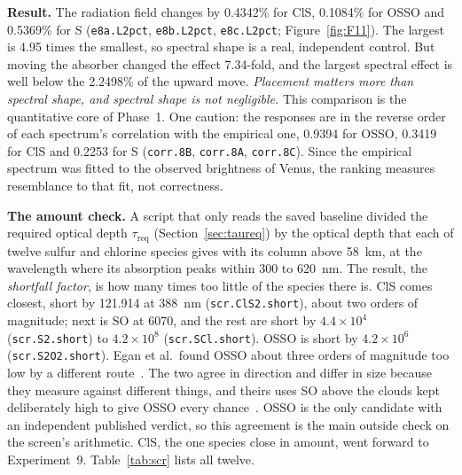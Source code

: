 \textbf{Result.} The radiation field changes by 0.4342\% for ClS, 0.1084\% for
OSSO and 0.5369\% for S (\texttt{e8a.L2pct}, \texttt{e8b.L2pct},
\texttt{e8c.L2pct}; Figure~\ref{fig:F11}). The largest is 4.95 times the smallest, so
spectral shape is a real, independent control. But moving the absorber changed the effect
7.34-fold, and the largest spectral effect is well below the 2.2498\% of the upward move.
\emph{Placement matters more than spectral shape, and spectral shape is not negligible.}
This comparison is the quantitative core of Phase~1. One caution: the responses are in the
reverse order of each spectrum's correlation with the empirical one, 0.9394 for OSSO,
0.3419 for ClS and 0.2253 for S (\texttt{corr.8B}, \texttt{corr.8A},
\texttt{corr.8C}). Since the empirical spectrum was fitted to the observed brightness of
Venus, the ranking measures resemblance to that fit, not correctness.

\textbf{The amount check.} A script that only reads the saved baseline divided the
required optical depth $\tau_{\mathrm{req}}$ (Section~\ref{sec:taureq}) by the optical
depth that each of twelve sulfur and chlorine species gives with its column above 58~km,
at the wavelength where its absorption peaks within 300 to 620~nm. The result, the
\emph{shortfall factor},
is how many times too little of the species there is. ClS comes closest, short by
121.914 at 388~nm (\texttt{scr.ClS2.short}), about two orders of magnitude; next is
SO at 6070, and the rest are short by $4.4\times10^{4}$ (\texttt{scr.S2.short}) to
$4.2\times10^{8}$ (\texttt{scr.SCl.short}). OSSO is short by $4.2\times10^{6}$
(\texttt{scr.S2O2.short}). Egan et al.\ found OSSO about three orders of magnitude too low
by a different route~\cite{egan2025osso}. The two agree in direction and differ in size
because they measure against different things, and theirs uses SO above the clouds
kept deliberately high to give OSSO every chance~\cite{egan2025osso}. OSSO is the only
candidate with an independent published verdict, so this agreement is the main outside
check on the screen's arithmetic. ClS, the one species close in amount, went
forward to Experiment~9. Table~\ref{tab:scr} lists all twelve.

